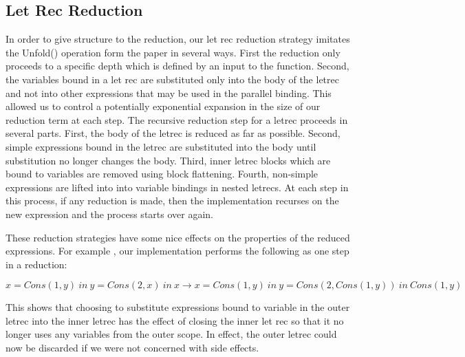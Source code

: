 \documentclass[preprint, 10pt]{sigplanconf}
\begin{document}
\subsection{Let Rec Reduction}
In order to give structure to the reduction, our let rec reduction strategy imitates the Unfold() operation form the paper in several ways.  First the reduction only proceeds to a specific depth which is defined by an input to the function.  Second, the variables bound in a let rec are substituted only into the body of the letrec and not into other expressions that may be used in the parallel binding.  This allowed us to control a potentially exponential expansion in the size of our reduction term at each step.  The recursive reduction step for a letrec proceeds in several parts.  First, the body of the letrec is reduced as far as possible.  Second, simple expressions bound in the letrec are substituted into the body until substitution no longer changes the body. Third, inner letrec blocks which are bound to variables are removed using block flattening.  Fourth, non-simple expressions are lifted into into variable bindings in nested letrecs. At each step in this process, if any reduction is made, then the implementation recurses on the new expression and the process starts over again.

These reduction strategies have some nice effects on the properties of the reduced expressions.  For example , our implementation performs the following as one step in a reduction:
\begin{center}
${x=Cons(1,y)\ in\ {y=Cons(2,x)\ in\ x}} \rightarrow 
{x=Cons(1,y)\ in\ {y=Cons(2,Cons(1,y))\ in\ Cons(1,y)}}$
\end{center}

This shows that choosing to substitute expressions bound to variable in the outer letrec into the inner letrec has the effect of closing the inner let rec so that it no longer uses any variables from the outer scope.  In effect, the outer letrec could now be discarded if we were not concerned with side effects.
\end{document}
